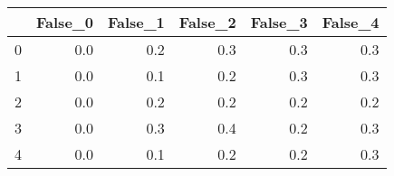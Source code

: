 \begin{tabular}{lrrrrr}
\toprule
{} &  False\_0 &  False\_1 &  False\_2 &  False\_3 &  False\_4 \\ \hline
\midrule
0 &      0.0 &      0.2 &      0.3 &      0.3 &      0.3 \\ \hline
1 &      0.0 &      0.1 &      0.2 &      0.3 &      0.3 \\ \hline
2 &      0.0 &      0.2 &      0.2 &      0.2 &      0.2 \\ \hline
3 &      0.0 &      0.3 &      0.4 &      0.2 &      0.3 \\ \hline
4 &      0.0 &      0.1 &      0.2 &      0.2 &      0.3 \\ \hline
\bottomrule
\end{tabular}
